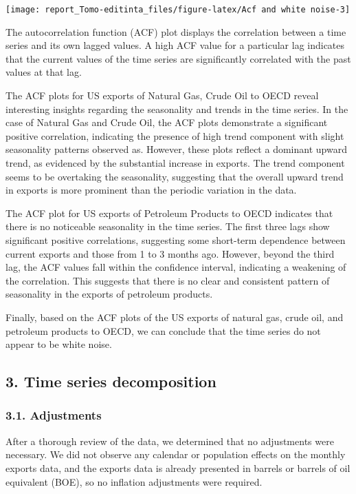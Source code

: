 \documentclass[
]{article}
\begin{document}
\begin{center}\texttt{[image: report\_Tomo-editinta\_files/figure-latex/Acf and white noise-3]} \end{center}

The autocorrelation function (ACF) plot displays the correlation between
a time series and its own lagged values. A high ACF value for a
particular lag indicates that the current values of the time series are
significantly correlated with the past values at that lag.

The ACF plots for US exports of Natural Gas, Crude Oil to OECD reveal
interesting insights regarding the seasonality and trends in the time
series. In the case of Natural Gas and Crude Oil, the ACF plots
demonstrate a significant positive correlation, indicating the presence
of high trend component with slight seasonality patterns observed as.
However, these plots reflect a dominant upward trend, as evidenced by
the substantial increase in exports. The trend component seems to be
overtaking the seasonality, suggesting that the overall upward trend in
exports is more prominent than the periodic variation in the data.

The ACF plot for US exports of Petroleum Products to OECD indicates that
there is no noticeable seasonality in the time series. The first three
lags show significant positive correlations, suggesting some short-term
dependence between current exports and those from 1 to 3 months ago.
However, beyond the third lag, the ACF values fall within the confidence
interval, indicating a weakening of the correlation. This suggests that
there is no clear and consistent pattern of seasonality in the exports
of petroleum products.

Finally, based on the ACF plots of the US exports of natural gas, crude
oil, and petroleum products to OECD, we can conclude that the time
series do not appear to be white noise.

\hypertarget{time-series-decomposition}{%
\subsection{3. Time series
decomposition}\label{time-series-decomposition}}

\hypertarget{adjustments}{%
\subsubsection{3.1. Adjustments}\label{adjustments}}

After a thorough review of the data, we determined that no adjustments
were necessary. We did not observe any calendar or population effects on
the monthly exports data, and the exports data is already presented in
barrels or barrels of oil equivalent (BOE), so no inflation adjustments
were required.
\end{document}
